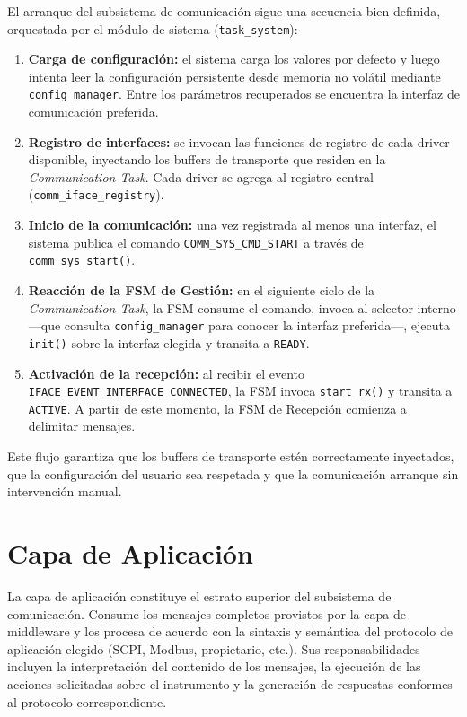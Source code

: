 El arranque del subsistema de comunicación sigue una secuencia bien definida, orquestada por el módulo de sistema (\texttt{task\_system}):

\begin{enumerate}
    \item \textbf{Carga de configuración:} el sistema carga los valores por defecto y luego intenta leer la configuración persistente desde memoria no volátil mediante \texttt{config\_manager}. Entre los parámetros recuperados se encuentra la interfaz de comunicación preferida.
    \item \textbf{Registro de interfaces:} se invocan las funciones de registro de cada driver disponible, inyectando los buffers de transporte que residen en la \textit{Communication Task}. Cada driver se agrega al registro central (\texttt{comm\_iface\_registry}).
    \item \textbf{Inicio de la comunicación:} una vez registrada al menos una interfaz, el sistema publica el comando \texttt{COMM\_SYS\_CMD\_START} a través de \texttt{comm\_sys\_start()}.
    \item \textbf{Reacción de la FSM de Gestión:} en el siguiente ciclo de la \textit{Communication Task}, la FSM consume el comando, invoca al selector interno —que consulta \texttt{config\_manager} para conocer la interfaz preferida—, ejecuta \texttt{init()} sobre la interfaz elegida y transita a \texttt{READY}.
    \item \textbf{Activación de la recepción:} al recibir el evento \texttt{IFACE\_EVENT\_INTERFACE\_CONNECTED}, la FSM invoca \texttt{start\_rx()} y transita a \texttt{ACTIVE}. A partir de este momento, la FSM de Recepción comienza a delimitar mensajes.
\end{enumerate}

Este flujo garantiza que los buffers de transporte estén correctamente inyectados, que la configuración del usuario sea respetada y que la comunicación arranque sin intervención manual.

\section{Capa de Aplicación}
\label{sec:capa-aplicacion}

La capa de aplicación constituye el estrato superior del subsistema de comunicación. Consume los mensajes completos provistos por la capa de middleware y los procesa de acuerdo con la sintaxis y semántica del protocolo de aplicación elegido (SCPI, Modbus, propietario, etc.). Sus responsabilidades incluyen la interpretación del contenido de los mensajes, la ejecución de las acciones solicitadas sobre el instrumento y la generación de respuestas conformes al protocolo correspondiente.

